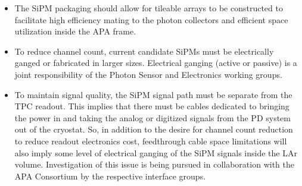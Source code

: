 \begin{itemize}
\item The SiPM packaging should allow for tileable arrays to be constructed to facilitate high efficiency mating to the photon collectors and efficient space utilization inside the APA frame.

\item To reduce channel count, current candidate SiPMs must be electrically ganged or fabricated in larger sizes. Electrical ganging (active or passive) is a joint responsibility of the Photon Sensor and Electronics working groups.

\item To maintain signal quality, the SiPM signal path must be separate from the TPC readout. This implies that there must be cables dedicated to bringing the power in and taking the analog or digitized signals from the PD system out of the cryostat. So, in addition to the desire for channel count reduction to reduce readout electronics cost, feedthrough cable space limitations will also imply some level of electrical ganging of the SiPM
signals inside the LAr volume. Investigation of this issue is being pursued in collaboration with the APA Consortium by the respective interface groups.
\end{itemize}

